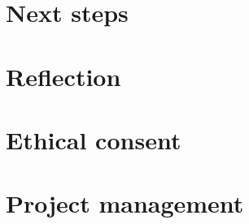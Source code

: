 \documentclass[10pt,a4paper]{article}
\begin{document}
\section{Next steps}

\section{Reflection}

\section{Ethical consent}

\section{Project management}



\appendix


\end{document}
